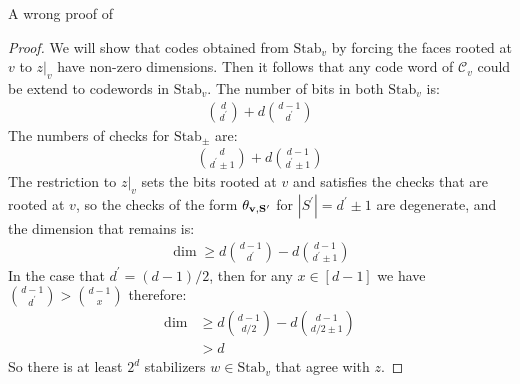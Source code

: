 A wrong proof of 
\begin{proof}
  We will show that codes obtained from $\text{Stab}_{v}$ by forcing the faces rooted at $v$ to $z|_{v}$ have non-zero dimensions. Then it follows that any code word of $\mathcal{C}_{v}$ could be extend to codewords in $\text{Stab}_{v}$. The number of bits in both $\text{Stab}_{v}$ is:
\begin{equation*}
  \begin{split}
      { d \choose d^{\prime} }  +  d { d - 1 \choose d^{\prime} } 
  \end{split}
\end{equation*}
The numbers of checks for $\text{Stab}_{\pm}$ are:
\begin{equation*}
  \begin{split}
 { d \choose d^{\prime} \pm 1 } + d { d-1  \choose d^{\prime} \pm 1 }  
 \end{split}
\end{equation*}
The restriction to $z|_{v}$ sets the bits rooted at $v$ and satisfies the checks that are rooted at $v$, so the checks of the form $\mathbf{\theta_{v ,S^{\prime}}{} }{}$ for $|S^{\prime}| = d^{\prime} \pm 1$ are degenerate, and the dimension that remains is:
\begin{equation*}
  \begin{split}
    \dim \ge d { d - 1 \choose d^{\prime} } - d { d-1  \choose d^{\prime} \pm 1 }  
  \end{split}
\end{equation*}
In the case that $d^\prime = (d-1)/2$, then for any $x \in [d-1]$ we have $ { d - 1 \choose d^{\prime} } >  { d-1 \choose x  }  $ therefore:
\begin{equation*}
  \begin{split}
    \dim &\ge d { d - 1 \choose d/2 } - d { d-1  \choose d/2 \pm 1 } \\
    & > d
  \end{split}
\end{equation*}
So there is at least $2^{d}$ stabilizers $w \in \text{Stab}_{v}$ that agree with $z$. 
\end{proof}


